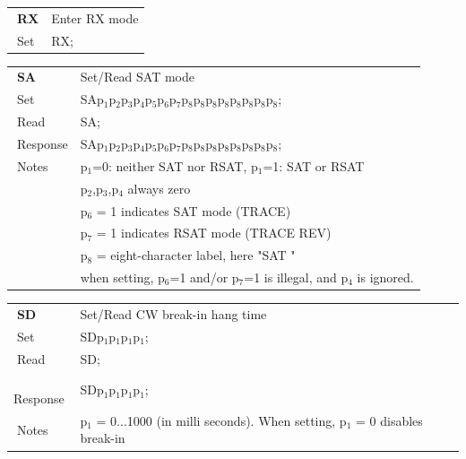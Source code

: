 \documentclass[12pt]{book}
\begin{document}
\begin{center}
\begin{tabular}{|p{2cm}|p{11cm}|}
\toprule
$\phantom{\Big|}$\textbf{\large RX} & Enter RX mode \\\cline{1-2}
$\phantom{\Big|}${\large Set} & {RX;} \\\hline
\bottomrule
\end{tabular}
\end{center}

\begin{center}
\begin{tabular}{|p{2cm}|p{11cm}|}
\toprule
$\phantom{\Big|}$\textbf{\large SA} & Set/Read SAT mode \\\cline{1-2}
$\phantom{\Big|}${\large Set} & {SAp$_1$p$_2$p$_3$p$_4$p$_5$p$_6$p$_7$p$_8$p$_8$p$_8$p$_8$p$_8$p$_8$p$_8$p$_8$;} \\\hline
$\phantom{\Big|}${\large Read} & {SA;} \\\hline
$\phantom{\Big|}${\large Response} & {SAp$_1$p$_2$p$_3$p$_4$p$_5$p$_6$p$_7$p$_8$p$_8$p$_8$p$_8$p$_8$p$_8$p$_8$p$_8$;} \\\hline
$\phantom{\Big|}${\large Notes} & \multicolumn{1}{|p{11cm}|}{p$_1$=0: neither SAT nor RSAT, p$_1$=1: SAT or RSAT} \\
 & \multicolumn{1}{|p{11cm}|}{p$_2$,p$_3$,p$_4$ always zero} \\
 & \multicolumn{1}{|p{11cm}|}{p$_6$ = 1 indicates SAT mode (TRACE)} \\
 & \multicolumn{1}{|p{11cm}|}{p$_7$ = 1 indicates RSAT mode (TRACE REV)} \\
 & \multicolumn{1}{|p{11cm}|}{p$_8$ = eight-character label, here "SAT     "} \\
 & \multicolumn{1}{|p{11cm}|}{when setting, p$_6$=1 and/or p$_7$=1 is illegal, and p$_4$ is ignored.} \\
\bottomrule
\end{tabular}
\end{center}

\begin{center}
\begin{tabular}{|p{2cm}|p{11cm}|}
\toprule
$\phantom{\Big|}$\textbf{\large SD} & Set/Read CW break-in hang time \\\cline{1-2}
$\phantom{\Big|}${\large Set} & {SDp$_1$p$_1$p$_1$p$_1$;} \\\hline
$\phantom{\Big|}${\large Read} & {SD;} \\\hline
$\phantom{\Big|}${\large Response} & {SDp$_1$p$_1$p$_1$p$_1$;} \\\hline
$\phantom{\Big|}${\large Notes} & \multicolumn{1}{|p{11cm}|}{p$_1$ = 0...1000 (in milli seconds). When setting, p$_1$ = 0  disables break-in} \\
\bottomrule
\end{tabular}
\end{center}
\end{document}
